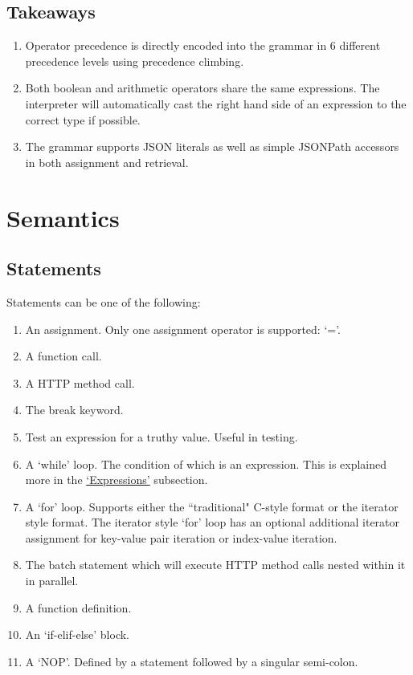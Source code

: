 \documentclass[12pt, letterpaper]{article}
\begin{document}
\subsection{Takeaways}

\begin{enumerate}
    \item Operator precedence is directly encoded into the grammar in 6 different precedence levels using precedence climbing.
    \item Both boolean and arithmetic operators share the same expressions. The interpreter will automatically cast the right hand side of an expression to the correct type if possible.
    \item The grammar supports JSON literals as well as simple JSONPath accessors in both assignment and retrieval.
\end{enumerate}

\section{Semantics}

\subsection{Statements}

Statements can be one of the following:

\begin{center}
    \begin{enumerate}
        \item An assignment. Only one assignment operator is supported: `='.
        \item A function call.
        \item A HTTP method call.
        \item The break keyword.
        \item Test an expression for a truthy value. Useful in testing.
        \item A `while' loop. The condition of which is an expression. This is explained more in the \hyperref[sec:expressions]{`Expressions'} subsection.
        \item A `for' loop. Supports either the ``traditional" C-style format or the iterator style format. The iterator style `for' loop has an optional additional iterator assignment for key-value pair iteration or index-value iteration.
        \item The batch statement which will execute HTTP method calls nested within it in parallel.
        \item A function definition.
        \item An `if-elif-else' block.
        \item A `NOP'. Defined by a statement followed by a singular semi-colon.
    \end{enumerate}
\end{center}
\end{document}
